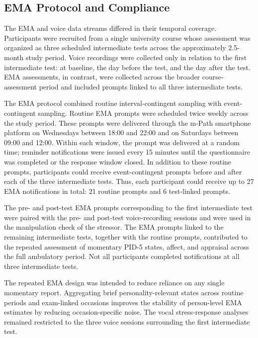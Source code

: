 \documentclass[
  english,
  man,floatsintext]{apa6}
\begin{document}
\subsection{EMA Protocol and Compliance}\label{s-ema-protocol}

The EMA and voice data streams differed in their temporal coverage. Participants were recruited from a single university course whose assessment was organized as three scheduled intermediate tests across the approximately 2.5-month study period. Voice recordings were collected only in relation to the first intermediate test: at baseline, the day before the test, and the day after the test. EMA assessments, in contrast, were collected across the broader course-assessment period and included prompts linked to all three intermediate tests.

The EMA protocol combined routine interval-contingent sampling with event-contingent sampling. Routine EMA prompts were scheduled twice weekly across the study period. These prompts were delivered through the m-Path smartphone platform on Wednesdays between 18:00 and 22:00 and on Saturdays between 09:00 and 12:00. Within each window, the prompt was delivered at a random time; reminder notifications were issued every 15 minutes until the questionnaire was completed or the response window closed. In addition to these routine prompts, participants could receive event-contingent prompts before and after each of the three intermediate tests. Thus, each participant could receive up to 27 EMA notifications in total: 21 routine prompts and 6 test-linked prompts.

The pre- and post-test EMA prompts corresponding to the first intermediate test were paired with the pre- and post-test voice-recording sessions and were used in the manipulation check of the stressor. The EMA prompts linked to the remaining intermediate tests, together with the routine prompts, contributed to the repeated assessment of momentary PID-5 states, affect, and appraisal across the full ambulatory period. Not all participants completed notifications at all three intermediate tests.

The repeated EMA design was intended to reduce reliance on any single momentary report. Aggregating brief personality-relevant states across routine periods and exam-linked occasions improves the stability of person-level EMA estimates by reducing occasion-specific noise. The vocal stress-response analyses remained restricted to the three voice sessions surrounding the first intermediate test.
\end{document}
